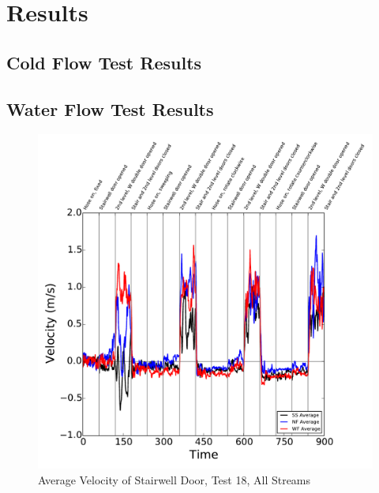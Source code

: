 \documentclass[12pt,oneside]{book}
\begin{document}
\clearpage

\chapter{Results}
\label{chap:Results}

\section{Cold Flow Test Results}
\label{sec:Cold_Flow_Test_Results}

\section{Water Flow Test Results}
\label{sec:Water_Flow_Test_Results}

\begin{figure}[!ht]
\includegraphics[width=6in]{../../Figures/Hose_Test_Figures/Test_18_West_063014_BDP_A10_Avg}
\caption{Average Velocity of Stairwell Door, Test 18, All Streams}
\label{fig:Test_18_BDP_A10_Avg_All}
\end{figure}
\end{document}
